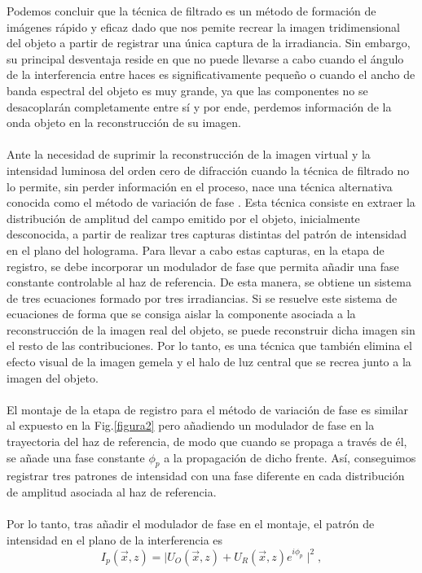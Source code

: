 \documentclass[12pt]{article}
\begin{document}
Podemos concluir que la técnica de filtrado es un  método de formación de imágenes rápido y eficaz dado que nos pemite recrear la imagen tridimensional del objeto a partir de registrar una única captura de la irradiancia.  Sin embargo, su principal desventaja reside en que no puede llevarse a cabo cuando el ángulo de la interferencia entre haces es significativamente pequeño o cuando el ancho de banda espectral del objeto es muy grande, ya que las componentes no se desacoplarán completamente entre sí y por ende, perdemos información de la onda objeto en la reconstrucción de su imagen.\\ \\
Ante la necesidad de suprimir la reconstrucción de la imagen virtual y la intensidad luminosa del orden cero de difracción cuando la técnica de filtrado no lo permite, sin perder información en el proceso, nace una técnica alternativa conocida como el método de variación de fase \cite{11}. Esta técnica  consiste  en extraer la distribución de amplitud del campo emitido por el objeto, inicialmente desconocida, a partir de realizar tres capturas distintas del patrón de intensidad en el plano del holograma. Para llevar a cabo estas capturas, en la etapa de registro, se debe incorporar un modulador de fase que permita añadir una fase constante controlable al haz de referencia. De esta manera, se obtiene un sistema de tres ecuaciones formado por  tres  irradiancias. Si se resuelve este sistema de ecuaciones de forma que se consiga aislar la componente asociada  a la reconstrucción de la imagen real del objeto, se puede reconstruir dicha imagen sin el resto de las contribuciones. Por lo tanto, es una técnica que también elimina el efecto visual de la imagen gemela y el halo de luz central que se recrea junto a la imagen del objeto. \\ \\
El montaje de la etapa de registro para el método de variación de fase  es similar al expuesto en la Fig.\ref{figura2} pero añadiendo un modulador de fase en la trayectoria del haz de referencia, de modo que cuando se propaga a través de él, se añade una fase  constante $\phi_p$ a la propagación de dicho frente. Así, conseguimos registrar tres patrones de intensidad con una fase diferente en cada distribución de amplitud asociada al haz de referencia.\\\\
Por lo tanto, tras añadir el modulador de fase en el montaje, el patrón de intensidad en el plano de la interferencia es
\begin{equation}
   I_p (\Vec{x}, z) =  \mid  U_O (\Vec{x}, z) + U_R (\Vec{x}, z)e^{i \phi_p}\mid ^{ 2 },
    \label{Ec.20}
\end{equation}
\end{document}
